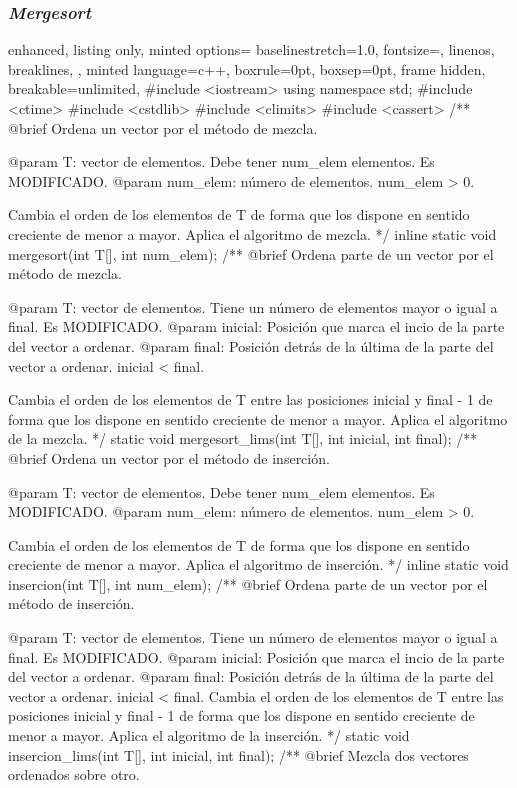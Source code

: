 \documentclass[12pt,spanish]{article}
\begin{document}
\subsubsection{\textit{Mergesort}}

\begin{multicols}{2}
\begin{tcblisting}
{
  enhanced,
  listing only,
  minted options={
    baselinestretch=1.0,
    fontsize=\footnotesize,
    linenos,
    breaklines,
  },
  minted language=c++,
  boxrule=0pt,
  boxsep=0pt,
  frame hidden,
  breakable=unlimited,
} 
#include <iostream>
using namespace std;
#include <ctime>
#include <cstdlib>
#include <climits>
#include <cassert>
/**
   @brief Ordena un vector por el método de mezcla.

   @param T: vector de elementos. Debe tener num_elem elementos.
             Es MODIFICADO.
   @param num_elem: número de elementos. num_elem > 0.

   Cambia el orden de los elementos de T de forma que los dispone
   en sentido creciente de menor a mayor. Aplica el algoritmo de mezcla.
*/
inline static 
void mergesort(int T[], int num_elem);
/**
   @brief Ordena parte de un vector por el método de mezcla.

   @param T: vector de elementos. Tiene un número de elementos 
                   mayor o igual a final. Es MODIFICADO.
   @param inicial: Posición que marca el incio de la parte del
                   vector a ordenar.
   @param final: Posición detrás de la última de la parte del
                   vector a ordenar. 
		   inicial < final.

   Cambia el orden de los elementos de T entre las posiciones
   inicial y final - 1 de forma que los dispone en sentido creciente
   de menor a mayor. Aplica el algoritmo de la mezcla.
*/
static void mergesort_lims(int T[], int inicial, int final);
/**
   @brief Ordena un vector por el método de inserción.

   @param T: vector de elementos. Debe tener num_elem elementos.
             Es MODIFICADO.
   @param num_elem: número de elementos. num_elem > 0.

   Cambia el orden de los elementos de T de forma que los dispone
   en sentido creciente de menor a mayor. Aplica el algoritmo de inserción.
*/
inline static 
void insercion(int T[], int num_elem);
/**
   @brief Ordena parte de un vector por el método de inserción.

   @param T: vector de elementos. Tiene un número de elementos 
                   mayor o igual a final. Es MODIFICADO.
   @param inicial: Posición que marca el incio de la parte del
                   vector a ordenar.
   @param final: Posición detrás de la última de la parte del
                   vector a ordenar. inicial < final.
   Cambia el orden de los elementos de T entre las posiciones
   inicial y final - 1 de forma que los dispone en sentido creciente
   de menor a mayor. Aplica el algoritmo de la inserción.
*/
static void insercion_lims(int T[], int inicial, int final);
/**
   @brief Mezcla dos vectores ordenados sobre otro.


\end{tcblisting}
\end{multicols}
\end{document}

